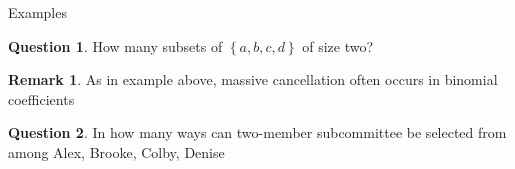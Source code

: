 \documentclass{beamer}
\theoremstyle{definition}
\newtheorem{remark}{Remark}
\newtheorem{question}{Question}
\newcommand\ncr[2]{\tensor[_{#1}]C{_{#2}}}
\begin{document}
\begin{frame}{Examples}
\begin{question}
How many subsets of $\left\{a,b,c,d\right\}$ of size two?
\end{question}
\only<+->{
\[\ncr{4}{2}
\only<+->{=\frac{6!}{4!2!}}
\only<+->{=\frac{6\cdot 5\cdot 4\cdot 3\cdot 2\cdot 1}
{4\cdot 3\cdot 2\cdot 1\cdot 2\cdot 1}}
\only<+->{=\frac{6\cdot 5\cdot \cancel{4}
\cdot\cancel{3}\cdot\cancel{2}\cdot\cancel{1}}
{\cancel{4}\cdot\cancel{3}\cdot\cancel{2}\cdot\cancel{1}\cdot 2\cdot\cancel{1}}}
\only<+->{=\frac{6\cdot 5}{2}}
\only<+->{=15}\]}
\begin{remark}
As in example above, massive cancellation often occurs in binomial coefficients
\end{remark}
\begin{question}
In how many ways can two-member subcommittee
be selected from among Alex, Brooke, Colby, Denise
\end{question}
\only<+->{\[\ncr{4}{2}=15\]}
\end{frame}
\end{document}
